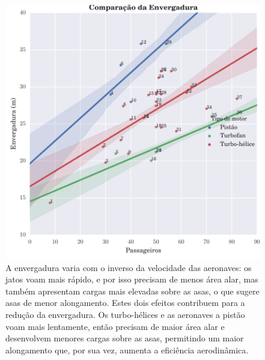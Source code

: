\begin{figure}
\centering
\includegraphics{../autogenerated/graficos_comparativos/envergadura.pdf}
\caption[Comparação da envergadura]{
A envergadura varia com o inverso da velocidade das aeronaves: os jatos voam mais rápido, e por isso precisam de menos área alar, mas também apresentam cargas mais elevadas sobre as asas, o que sugere asas de menor alongamento. Estes dois efeitos contribuem para a redução da envergadura. Os turbo-hélices e as aeronaves a pistão voam mais lentamente, então precisam de maior área alar e desenvolvem menores cargas sobre as asas, permitindo um maior alongamento que, por sua vez, aumenta a eficiência aerodinâmica.
}
\label{fig:envergadura}
\end{figure}

